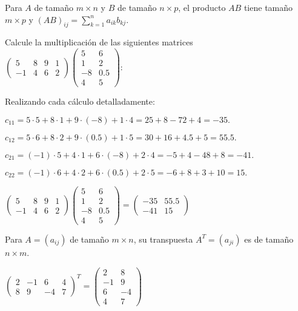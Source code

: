 \begin{definition}
Para $A$ de tamaño $m \times n$ y $B$ de tamaño $n \times p$, el producto $AB$ tiene tamaño $m \times p$ y $(AB)_{ij} = \sum_{k=1}^n a_{ik}b_{kj}$.
\end{definition}
\begin{example}Calcule la multiplicación de las siguientes matrices 
\(
\begin{pmatrix} 5 & 8 & 9 & 1 \\ -1 & 4 & 6 & 2 \end{pmatrix}
\begin{pmatrix} 5 & 6 \\ 1 & 2 \\ -8 & 0.5 \\ 4 & 5 \end{pmatrix}
\):
\begin{myproof} Realizando cada cálculo detalladamente:

$c_{11} = 5\cdot5 + 8\cdot1 + 9\cdot(-8) + 1\cdot4 = 25 + 8 - 72 + 4 = -35. $

$c_{12} = 5\cdot6 + 8\cdot2 + 9\cdot(0.5) + 1\cdot5 = 30 + 16 + 4.5 + 5 = 55.5.$

$c_{21} = (-1)\cdot5 + 4\cdot1 + 6\cdot(-8) + 2\cdot4 = -5 + 4 - 48 + 8 = -41.$

$c_{22} = (-1)\cdot6 + 4\cdot2 + 6\cdot(0.5) + 2\cdot5 = -6 + 8 + 3 + 10 = 15.$

\(
\boxed{\begin{pmatrix} 5 & 8 & 9 & 1 \\ -1 & 4 & 6 & 2 \end{pmatrix}
\begin{pmatrix} 5 & 6 \\ 1 & 2 \\ -8 & 0.5 \\ 4 & 5 \end{pmatrix}
= \begin{pmatrix} -35 & 55.5 \\ -41 & 15 \end{pmatrix}}
\)
\end{myproof}
\end{example}

\begin{definition}
Para $A = (a_{ij})$ de tamaño $m \times n$, su transpuesta $A^T = (a_{ji})$ es de tamaño $n \times m$.
\end{definition}
\begin{example} $\begin{pmatrix} 2 & -1 & 6 & 4 \\ 8 & 9 & -4 & 7 \end{pmatrix}^T = \begin{pmatrix} 2 & 8 \\ -1 & 9 \\ 6 & -4 \\ 4 & 7 \end{pmatrix}$
\end{example}

